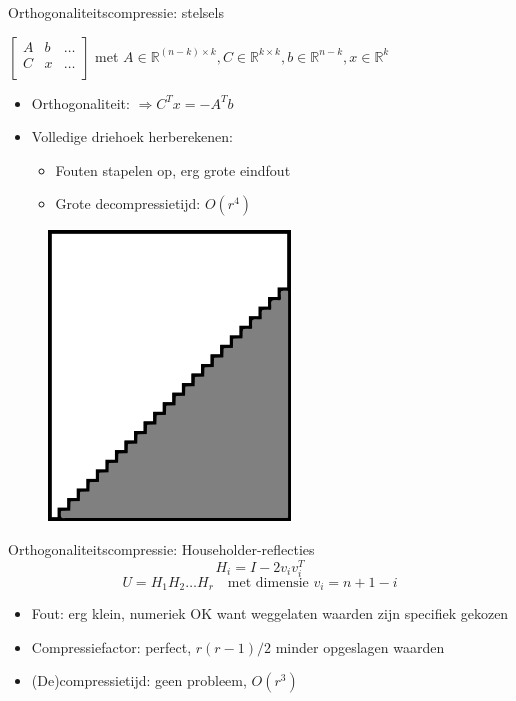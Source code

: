 \documentclass[t,12pt,dutch
\ifx\beamermode\undefined\else,\beamermode\fi
]{beamer}
\begin{document}
\begin{frame}{Orthogonaliteitscompressie: stelsels}

\begin{center}
$
\begin{bmatrix}
A & b & \dots \\[0.3em]
C & x & \dots \\[0.3em]
\end{bmatrix}
$
met $A \in \mathbb{R}^{(n-k) \times k}, C \in \mathbb{R}^{k \times k}, b \in \mathbb{R}^{n - k}, x \in \mathbb{R}^{k}$
\end{center}

\begin{itemize}
\item Orthogonaliteit: $\Rightarrow C^T x = -A^T b$
\item Volledige driehoek herberekenen:
\begin{itemize}
\item Fouten stapelen op, erg grote eindfout
\item Grote decompressietijd: $O(r^4)$
\end{itemize}
\end{itemize}

\begin{figure}[H]
\centering
\includegraphics[scale=0.8]{images/orthogonality_compression1.png}
\end{figure}

\end{frame}

\fi

\begin{frame}{Orthogonaliteitscompressie: Householder-reflecties}
\[
H_i = I - 2 v_i v_i^T
\]
\[
U = H_1 H_2 \dots H_r \quad \text{met dimensie } v_i = n + 1 - i
\]
\begin{itemize}
\item Fout: erg klein, numeriek OK want weggelaten waarden zijn specifiek gekozen
\item Compressiefactor: perfect, $r (r - 1)/2$ minder opgeslagen waarden
\item (De)compressietijd: geen probleem, $O(r^3)$
\end{itemize}
\end{frame}
\end{document}

